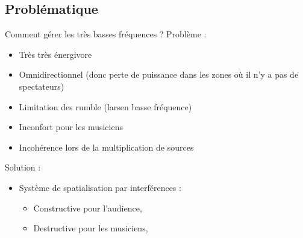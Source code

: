 \documentclass[aspectratio=169]{beamer}
\begin{document}
\subsection{Problématique}
\begin{frame}{Comment gérer les très basses fréquences ?}
Problème : 
\begin{itemize}
	\item Très très énergivore
	\item Omnidirectionnel (donc perte de puissance dans les zones où il n'y a pas de spectateurs)
	\item Limitation des rumble (larsen basse fréquence)
	\item Inconfort pour les musiciens
	\item Incohérence lors de la multiplication de sources
\end{itemize}
Solution : 
\begin{itemize}
	\item Système de spatialisation par interférences :
	\begin{itemize}
		\item Constructive pour l'audience,
		\item Destructive pour les musiciens,
	\end{itemize}
\end{itemize}
\end{frame}
\end{document}
